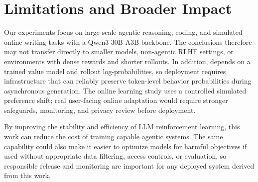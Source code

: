 \section{Limitations and Broader Impact}

Our experiments focus on large-scale agentic reasoning, coding, and simulated online writing tasks with a Qwen3-30B-A3B backbone. The conclusions therefore may not transfer directly to smaller models, non-agentic RLHF settings, or environments with dense rewards and shorter rollouts. In addition, \model depends on a trained value model and rollout log-probabilities, so deployment requires infrastructure that can reliably preserve token-level behavior probabilities during asynchronous generation. The online learning study uses a controlled simulated preference shift; real user-facing online adaptation would require stronger safeguards, monitoring, and privacy review before deployment.

By improving the stability and efficiency of LLM reinforcement learning, this work can reduce the cost of training capable agentic systems. The same capability could also make it easier to optimize models for harmful objectives if used without appropriate data filtering, access controls, or evaluation, so responsible release and monitoring are important for any deployed system derived from this work.